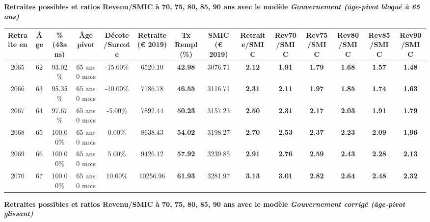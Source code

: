 {\bf \noindent Retraites possibles et ratios Revenu/SMIC à 70, 75, 80, 85, 90 ans avec le modèle \emph{Gouvernement (âge-pivot bloqué à 65 ans)}}  
 
\begin{adjustbox}{max width=\textwidth} 
\begin{tabular}[htb]{|c|c||c|c|c||c|c||c||c|c|c|c|c|c|} 
\hline 
 Retraite en &  Âge &  \%(43ans) &  Âge pivot &  Décote/Surcote &  Retraite (\euro{} 2019) &  Tx Rempl(\%) &  SMIC (\euro{} 2019) &  Retraite/SMIC &  Rev70/SMIC &  Rev75/SMIC &  Rev80/SMIC &  Rev85/SMIC &  Rev90/SMIC \\ 
\hline \hline 
 2065 &  62 &  93.02\% &  65 ans 0 mois &  -15.00\% &  6520.10 &  {\bf 42.98} &  3076.71 &  {\bf 2.12} &  {\bf 1.91} &  {\bf 1.79} &  {\bf 1.68} &  {\bf 1.57} &  {\bf 1.48} \\ 
\hline 
 2066 &  63 &  95.35\% &  65 ans 0 mois &  -10.00\% &  7186.78 &  {\bf 46.55} &  3116.71 &  {\bf 2.31} &  {\bf 2.11} &  {\bf 1.97} &  {\bf 1.85} &  {\bf 1.74} &  {\bf 1.63} \\ 
\hline 
 2067 &  64 &  97.67\% &  65 ans 0 mois &  -5.00\% &  7892.44 &  {\bf 50.23} &  3157.23 &  {\bf 2.50} &  {\bf 2.31} &  {\bf 2.17} &  {\bf 2.03} &  {\bf 1.91} &  {\bf 1.79} \\ 
\hline 
 2068 &  65 &  100.00\% &  65 ans 0 mois &  0.00\% &  8638.43 &  {\bf 54.02} &  3198.27 &  {\bf 2.70} &  {\bf 2.53} &  {\bf 2.37} &  {\bf 2.23} &  {\bf 2.09} &  {\bf 1.96} \\ 
\hline 
 2069 &  66 &  100.00\% &  65 ans 0 mois &  5.00\% &  9426.12 &  {\bf 57.92} &  3239.85 &  {\bf 2.91} &  {\bf 2.76} &  {\bf 2.59} &  {\bf 2.43} &  {\bf 2.28} &  {\bf 2.13} \\ 
\hline 
 2070 &  67 &  100.00\% &  65 ans 0 mois &  10.00\% &  10256.96 &  {\bf 61.93} &  3281.97 &  {\bf 3.13} &  {\bf 3.01} &  {\bf 2.82} &  {\bf 2.64} &  {\bf 2.48} &  {\bf 2.32} \\ 
\hline 
\hline 
\end{tabular} 
\end{adjustbox} 
 
 \vspace{0.1cm} 
{\bf \noindent Retraites possibles et ratios Revenu/SMIC à 70, 75, 80, 85, 90 ans avec le modèle \emph{Gouvernement corrigé (âge-pivot glissant)}}  
 
